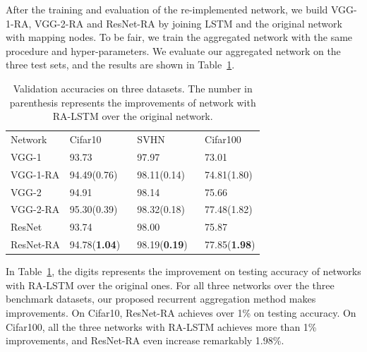 \documentclass[runningheads]{llncs}
\begin{document}
After the training and evaluation of the re-implemented network, we build VGG-1-RA, VGG-2-RA and ResNet-RA by joining LSTM and the original network with mapping nodes. To be fair, we train the aggregated network with the same procedure and hyper-parameters. We evaluate our aggregated network on the three test sets, and the results are shown in Table~\ref{table:test}.
\setlength{\tabcolsep}{4pt}
\begin{table}
\begin{center}
\caption{Validation accuracies on three datasets. The number in parenthesis represents the improvements of network with RA-LSTM over the original network.}
\label{table:test}
\begin{tabular}{llll}
\hline\noalign{\smallskip}
Network& Cifar10 & SVHN & Cifar100\\
\noalign{\smallskip}
\hline
\noalign{\smallskip}
VGG-1 & 93.73 & 97.97 & 73.01\\
VGG-1-RA & 94.49(0.76)$\quad$ & 98.11(0.14)$\quad$ & 74.81(1.80)\\
VGG-2 & 94.91 & 98.14 & 75.66\\
VGG-2-RA & 95.30(0.39) & 98.32(0.18) & 77.48(1.82)\\
ResNet & 93.74 & 98.00 & 75.87\\
ResNet-RA & 94.78(\textbf{1.04}) & 98.19(\textbf{0.19}) & 77.85(\textbf{1.98})\\
\hline
\end{tabular}
\end{center}
\end{table}
\setlength{\tabcolsep}{1.4pt}

In Table~\ref{table:test}, the digits represents the improvement on testing accuracy of networks with RA-LSTM over the original ones. For all three networks over the three benchmark datasets, our proposed recurrent aggregation method makes improvements. On Cifar10, ResNet-RA achieves over 1\% on testing accuracy. On Cifar100, all the three networks with RA-LSTM achieves more than 1\% improvements, and ResNet-RA even increase remarkably 1.98\%.
\end{document}
